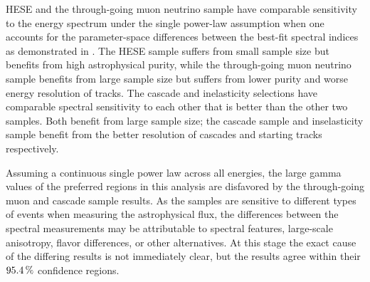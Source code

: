 HESE and the through-going muon neutrino sample have comparable sensitivity to the energy spectrum under the single power-law assumption when one accounts for the parameter-space differences between the best-fit spectral indices as demonstrated in .
The HESE sample suffers from small sample size but benefits from high astrophysical purity, while the through-going muon neutrino sample benefits from large sample size but suffers from lower purity and worse energy resolution of tracks.
The cascade and inelasticity selections have comparable spectral sensitivity to each other that is better than the other two samples.
Both benefit from large sample size; the cascade sample and inselasticity sample benefit from the better resolution of cascades and starting tracks respectively.

Assuming a continuous single power law across all energies, the large gamma values of the preferred regions in this analysis are disfavored by the through-going muon and cascade sample results.
As the samples are sensitive to different types of events when measuring the astrophysical flux, the differences between the spectral measurements may be attributable to spectral features, large-scale anisotropy, flavor differences, or other alternatives.
At this stage the exact cause of the differing results is not immediately clear, but the results agree within their $\SI{95.4}\percent$ confidence regions.

